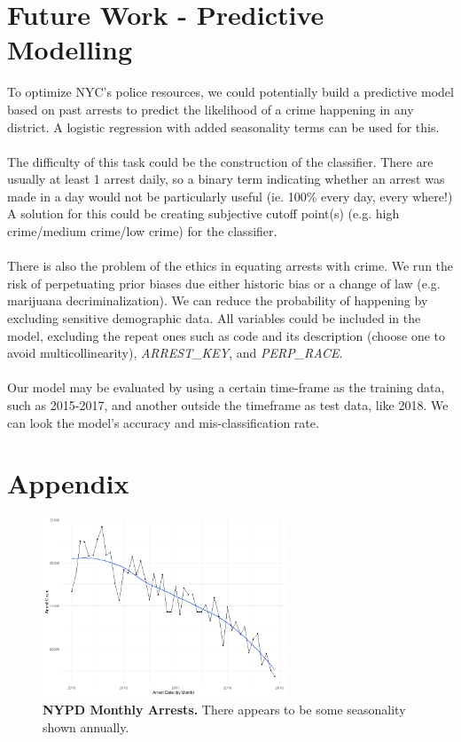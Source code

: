 \documentclass[11pt]{article}\usepackage[]{graphicx}\usepackage[]{color}
\begin{document}
\section{Future Work - Predictive Modelling}
To optimize NYC's police resources, we could potentially build a predictive model based on past arrests to predict the likelihood of a crime happening in any district. A logistic regression with added seasonality terms can be used for this.
\\\\
The difficulty of this task could be the construction of the classifier. There are usually at least 1 arrest daily, so a binary term indicating whether an arrest was made in a day would not be particularly useful (ie. 100\% every day, every where!) A solution for this could be creating subjective cutoff point(s) (e.g. high crime/medium crime/low crime) for the classifier. 
\\\\
There is also the problem of the ethics in equating arrests with crime. We run the risk of perpetuating prior biases due either historic bias or a change of law (e.g. marijuana decriminalization). We can reduce the probability of happening by excluding sensitive demographic data. All variables could be included in the model, excluding the repeat ones such as code and its description (choose one to avoid multicollinearity), \textit{ARREST\_KEY}, and \textit{PERP\_RACE}.
\\\\
Our model may be evaluated by using a certain time-frame as the training data, such as 2015-2017, and another outside the timeframe as test data, like 2018. We can look the model's accuracy and mis-classification rate.

\newpage

\section{Appendix}

\begin{figure}[H]
  \centering
    \includegraphics[width=0.65\textwidth]{monthlyArrests.png}
  \caption{\textbf{NYPD Monthly Arrests.} There appears to be some seasonality shown annually.}
  \label{fig:monthlyArrests}
\end{figure}
\end{document}
